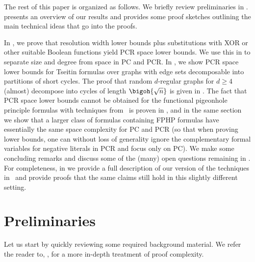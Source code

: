 %


  The rest of this paper is organized as follows.
  We briefly review preliminaries in
 .
   presents an overview of
  our results and provides some proof sketches outlining the main
  technical ideas that go into the proofs.
%

  In
 ,
  we prove that resolution width lower bounds plus substitutions with
  XOR or other suitable Boolean functions yield PCR space lower bounds.
  We use this in 
  to separate size and degree from space in PC and PCR.
  In
 ,
  we show PCR space lower bounds for Tseitin formulas over graphs
  with edge sets decomposable into partitions of %
  short  %
  cycles.
  The proof that random \mbox{$d$-regular} graphs for $d \geq 4$ (almost)
  decompose into cycles of length $\bigoh{\sqrt{n}}$ is given in
 .
  The fact that PCR space lower bounds cannot be obtained for the
  functional pigeonhole principle formulas with techniques from~\cite{BG15Framework} is
  proven in
 ,
  and in the same section 
  we show that a larger class of formulas containing FPHP formulas
  have essentially the same space complexity for PC and PCR
  (so that when proving lower bounds, one can without loss of
  generality ignore the complementary formal variables for negative literals
  in PCR and focus only on PC).
%
%
%
  We make some concluding remarks and discuss some of the
  (many) open questions remaining in 
 .  %
  For completeness, 
  in
  we provide a full description of our version of
  the techniques in~\cite{BG15Framework}
  and provide proofs that the same claims  still hold in this slightly
  different setting. 
 
%
\section{Preliminaries}
\label{sec:preliminaries}

Let us start by quickly reviewing some required background material. 
We refer the reader to, 
%
%
\eg,      %
\cite{BN21ProofCplxSAT,Krajicek19ProofComplexity}
for a more in-depth treatment of proof complexity.

